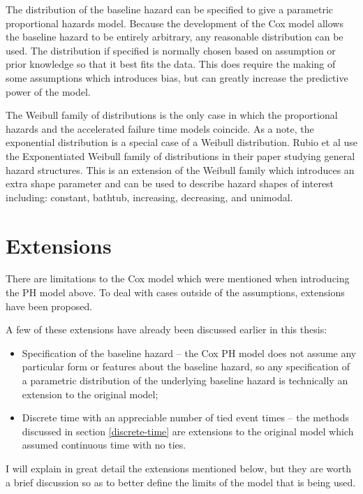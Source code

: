 The distribution of the baseline hazard can be specified to give a parametric proportional hazards model. Because the development of the Cox model allows the baseline hazard to be entirely arbitrary, any reasonable distribution can be used. The distribution if specified is normally chosen based on assumption or prior knowledge so that it best fits the data. This does require the making of some assumptions which introduces bias, but can greatly increase the predictive power of the model.

The Weibull family of distributions is the only case in which the proportional hazards and the accelerated failure time models coincide. As a note, the exponential distribution is a special case of a Weibull distribution. Rubio et al  use the Exponentiated Weibull family of distributions in their paper studying general hazard structures. This is an extension of the Weibull family which introduces an extra shape parameter and can be used to describe hazard shapes of interest including: constant, bathtub, increasing, decreasing, and unimodal.

\section{Extensions}\label{extensions}

There are limitations to the Cox model which were mentioned when introducing the PH model above. To deal with cases outside of the assumptions, extensions have been proposed. 

A few of these extensions have already been discussed earlier in this thesis:

\begin{itemize}
    \item Specification of the baseline hazard -- the Cox PH model does not assume any particular form or features about the baseline hazard, so any specification of a parametric distribution of the underlying baseline hazard is technically an extension to the original model;
    \item Discrete time with an appreciable number of tied event times -- the methods discussed in section \ref{discrete-time} are extensions to the original model which assumed continuous time with no ties.
\end{itemize}

I will explain in great detail the extensions mentioned below, but they are worth a brief discussion so as to better define the limits of the model that is being used.

